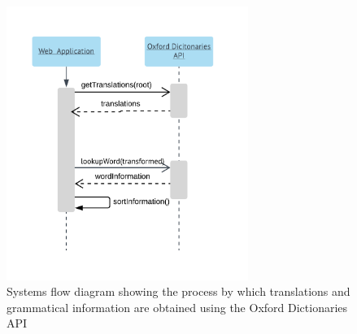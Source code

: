 \begin{figure}[H]
	\caption[Systems Flow Diagram of the Oxford Dictionaries API]{Systems flow diagram showing the process by which translations and grammatical information are obtained using the Oxford Dictionaries API}
	\label{fig:odsf}
	\begin{center}
	\includegraphics[width=0.7\textwidth]{Graphics/SystemsFlowOxford}
\end{center}
\end{figure}